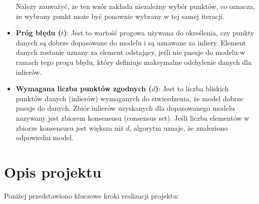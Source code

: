 \documentclass[12pt]{article}
\begin{document}
\begin{itemize}
    Należy zauważyć, że ten wzór zakłada niezależny wybór punktów, co oznacza, że wybrany punkt może być ponownie wybrany w tej samej iteracji.
    
    \item \textbf{Próg błędu ($t$)}: Jest to wartość progowa używana do określenia, czy punkty danych są dobrze dopasowane do modelu i są uznawane za inliery. Element danych zostanie uznany za element odstający, jeśli nie pasuje do modelu w ramach tego progu błędu, który definiuje maksymalne odchylenie danych dla inlierów.

    \item \textbf{Wymagana liczba punktów zgodnych ($d$)}: Jest to liczba bliskich punktów danych (inlierów) wymaganych do stwierdzenia, że model dobrze pasuje do danych. Zbiór inlierów uzyskanych dla dopasowanego modelu nazywany jest zbiorem konsensusu (consensus set). Jeśli liczba elementów w zbiorze konsensusu jest większa niż $d$, algorytm uznaje, że znaleziono odpowiedni model.
\end{itemize}




\newpage
\section{Opis projektu}

Poniżej przedstawiono kluczowe kroki realizacji projektu:
\end{document}

